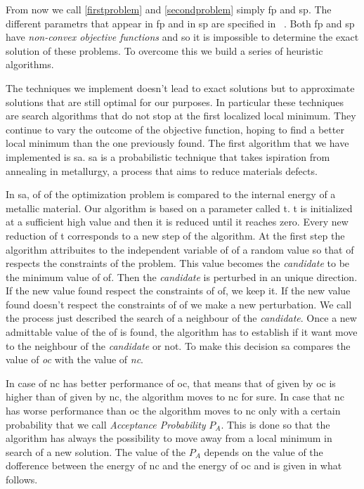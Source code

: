 \documentclass[journal]{IEEEtran}
\begin{document}
From now we call \ref{firstproblem} and \ref{secondproblem} simply \gls{fp} and \gls{sp}. The different parametrs that appear in \gls{fp} and in \gls{sp} are specified in ~\cite{Lin2007}. Both \gls{fp} and \gls{sp} have \textit{non-convex objective functions} and so it is impossible to determine the exact solution of these problems. To overcome this we build a series of heuristic algorithms.

The techniques we implement doesn't lead to exact solutions but to approximate solutions that are still optimal for our purposes. In particular these techniques are search algorithms that do not stop at the first localized local minimum. They continue to vary the outcome of the objective function, hoping to find a better local minimum than the one previously found. The first algorithm that we have implemented is \gls{sa}. \gls{sa} is a probabilistic technique that takes ispiration from annealing in metallurgy, a process that aims to reduce materials defects.

In \gls{sa}, \gls{of} of the optimization problem is compared to the internal energy of a metallic material. Our algorithm is based on a parameter called \gls{t}. \gls{t} is initialized at a sufficient high value and then it is reduced until it reaches zero. Every new reduction of \gls{t} corresponds to a new step of the algorithm. At the first step the algorithm attribuites to the independent variable of \gls{of} a random value so that \gls{of} respects the constraints of the problem. This value becomes the \textit{candidate} to be the minimum value of \gls{of}. Then the \textit{candidate} is perturbed in an unique direction. If the new value found respect the constraints of \gls{of}, we keep it. If the new value found doesn't respect the constraints of \gls{of} we make a new perturbation. We call the process just described the search of a neighbour of the \textit{candidate}. Once a new admittable value of the \gls{of} is found, the algorithm has to establish if it want move to the neighbour of the \textit{candidate} or not. To make this decision \gls{sa} compares the value of \textit{oc} with the value of \textit{nc}.

 In case of \gls{nc} has better performance of \gls{oc}, that means that \gls{of} given by \gls{oc} is higher than \gls{of} given by \gls{nc}, the algorithm moves to \gls{nc} for sure. In case that \gls{nc} has worse performance than \gls{oc} the algorithm moves to \gls{nc} only with a certain probability that we call \textit{Acceptance Probability} $P_A$. This is done so that the algorithm has always the possibility to move away from a local minimum in search of a new solution. The value of the $P_A$ depends on the value of the dofference between the energy of \gls{nc} and the energy of \gls{oc} and is given in what follows.
\end{document}
